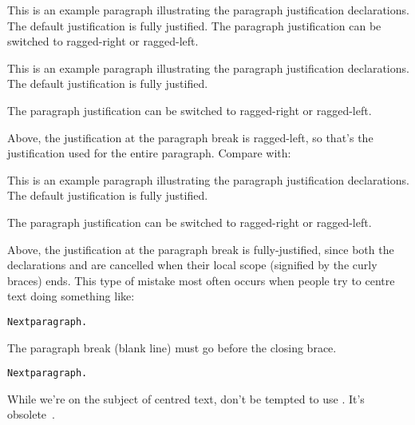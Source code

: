 \begin{code}
This is an example paragraph illustrating the paragraph justification declarations. The default justification is fully justified.
 The paragraph justification can be switched to
ragged-right or  ragged-left.
\end{code}
\begin{result}
This is an example paragraph illustrating the paragraph justification declarations. The default justification is fully justified.
\raggedright The paragraph justification can be switched to
ragged-right or \raggedleft ragged-left.
\par
\end{result}
Above, the justification at the paragraph break is ragged-left, so
that's the justification used for the entire paragraph.
Compare with:
\begin{code}
\end{code}
\begin{result}
\setlength{\parindent}{1.5em}%
{This is an example paragraph illustrating the paragraph justification declarations. The default justification is fully justified.
\raggedright The paragraph justification can be switched to
ragged-right or \raggedleft ragged-left.}\relax
\par
\end{result}
Above, the justification at the paragraph break is fully-justified,
since both the declarations  and
 are cancelled when their local scope (signified
by the curly braces) ends.
This type of mistake most often occurs when people try to centre
text doing something like:
\begin{alltt}
\wrong
Next paragraph.
\end{alltt}
The paragraph break (blank line) must go before the closing brace.
\begin{alltt}
Next paragraph.
\end{alltt}

\warning While we're on the subject of centred text, don't be
tempted to use . It's obsolete~\cite{l2tabu}.

